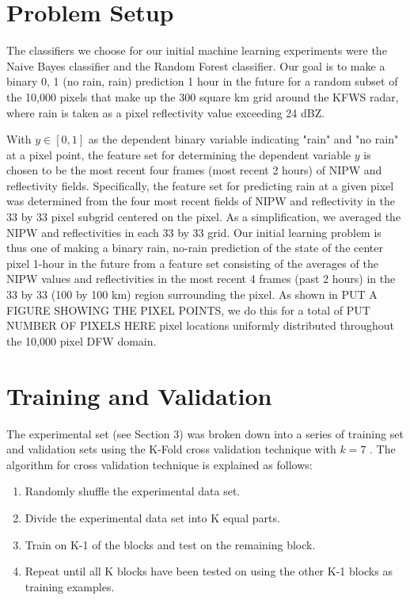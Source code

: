 \documentclass[proposal]{umassthesis}
\begin{document}
{\section{Problem Setup}

The classifiers we choose for our initial machine learning experiments were the Naive Bayes classifier and the Random Forest classifier. Our goal is to make a binary 0, 1 (no rain, rain) prediction 1 hour in the future for a random subset of the 10,000 pixels that make up the 300 square km grid around the KFWS radar, where rain is taken as a pixel reflectivity value exceeding 24 dBZ.

With $y\in[0,1]$ as the dependent binary variable indicating "rain" and "no rain" at a pixel point, the feature set for determining the dependent variable $y$ is chosen to be the most recent four frames (most recent 2 hours) of NIPW and reflectivity fields. Specifically, the feature set for predicting rain at a given pixel was determined from the four most recent fields of NIPW and reflectivity in the 33 by 33 pixel subgrid centered on the pixel. As a simplification, we averaged the NIPW and reflectivities in each 33 by 33 grid. Our initial learning problem is thus one of making a binary rain, no-rain prediction of the state of the center pixel 1-hour in the future from a feature set consisting of the averages of the NIPW values and reflectivities in the most recent 4 frames (past 2 hours) in the 33 by 33 (100 by 100 km) region surrounding the pixel. As shown in PUT A FIGURE SHOWING THE PIXEL POINTS, we do this for a total of PUT NUMBER OF PIXELS HERE pixel locations uniformly distributed throughout the 10,000 pixel DFW domain.

\section{Training and Validation}

The experimental set (see Section 3) was broken down into a series of training set and validation sets using the K-Fold cross validation technique with $k=7$ \cite{friedman2001elements}. The algorithm for cross validation technique is explained as follows:
 
\begin{enumerate}
\item Randomly shuffle the experimental data set. 
\item Divide the experimental data set into K equal parts.
\item Train on K-1 of the blocks and test on the remaining block. 
\item Repeat until all K blocks have been tested on using the other K-1 blocks as training examples. 
\end{enumerate}

}
\end{document}
